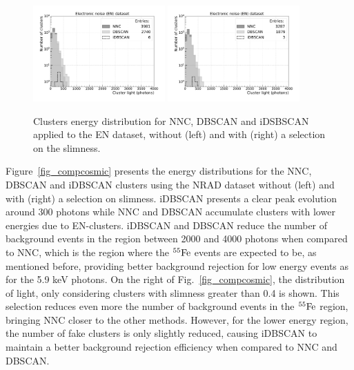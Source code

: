 \documentclass[a4paper,11pt]{article}
\begin{document}
\begin{figure}[ht]
\centering
\includegraphics[width=0.45\textwidth]{LigthYield_No_wo.pdf}
\includegraphics[width=0.45\textwidth]{LigthYield_No_Slim.pdf}
\caption{Clusters energy distribution for NNC, DBSCAN and iDSBSCAN applied to the EN dataset, without (left) and with (right) a selection on the slimness.}
\label{fig_compnoise}
\end{figure}


Figure~\ref{fig_compcosmic} presents the energy distributions for the NNC, DBSCAN and iDBSCAN clusters using the NRAD dataset without (left) and with (right) a selection on slimness.
iDBSCAN presents a clear peak evolution around 300 photons while NNC and DBSCAN accumulate clusters with lower energies due to EN-clusters.
iDBSCAN and DBSCAN reduce the number of background events in the region between 2000 and 4000 photons when compared to NNC, which is the region where the $\rm ^{55}Fe$ events are expected to be, as mentioned before, providing better background rejection for low energy events as for the 5.9 keV photons.
On the right of Fig.~\ref{fig_compcosmic}, the distribution of light, only considering clusters with slimness greater than 0.4 is shown. This selection reduces even more the number of background events in the $\rm ^{55}Fe$ region, bringing NNC closer to the other methods. 
However, for the lower energy region, the number of fake clusters is only slightly reduced, causing iDBSCAN to maintain a better background rejection efficiency when compared to NNC and DBSCAN.
\end{document}
